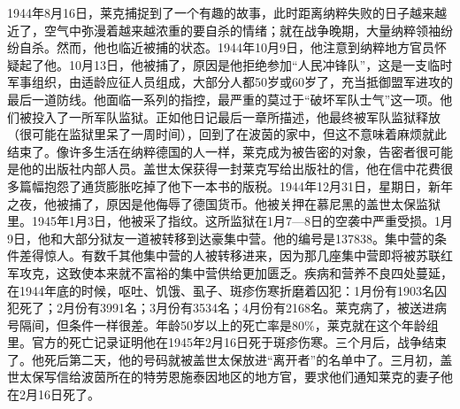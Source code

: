 \documentclass[UTF8]{ctexart}
\begin{document}
1944年8月16日，莱克捕捉到了一个有趣的故事，此时距离纳粹失败的日子越来越近了，空气中弥漫着越来越浓重的要自杀的情绪；就在战争晚期，大量纳粹领袖纷纷自杀。然而，他也临近被捕的状态。1944年10月9日，他注意到纳粹地方官员怀疑起了他。10月13日，他被捕了，原因是他拒绝参加“人民冲锋队”，这是一支临时军事组织，由适龄应征人员组成，大部分人都50岁或60岁了，充当抵御盟军进攻的最后一道防线。他面临一系列的指控，最严重的莫过于“破坏军队士气”这一项。他们被投入了一所军队监狱。正如他日记最后一章所描述，他最终被军队监狱释放（很可能在监狱里呆了一周时间），回到了在波茵的家中，但这不意味着麻烦就此结束了。像许多生活在纳粹德国的人一样，莱克成为被告密的对象，告密者很可能是他的出版社内部人员。盖世太保获得一封莱克写给出版社的信，他在信中花费很多篇幅抱怨了通货膨胀吃掉了他下一本书的版税。1944年12月31日，星期日，新年之夜，他被捕了，原因是他侮辱了德国货币。他被关押在慕尼黑的盖世太保监狱里。1945年1月3日，他被采了指纹。这所监狱在1月7—8日的空袭中严重受损。1月9日，他和大部分狱友一道被转移到达豪集中营。他的编号是137838。集中营的条件差得惊人。有数千其他集中营的人被转移进来，因为那几座集中营即将被苏联红军攻克，这致使本来就不富裕的集中营供给更加匮乏。疾病和营养不良四处蔓延，在1944年底的时候，呕吐、饥饿、虱子、斑疹伤寒折磨着囚犯：1月份有1903名囚犯死了；2月份有3991名；3月份有3534名；4月份有2168名。莱克病了，被送进病号隔间，但条件一样很差。年龄50岁以上的死亡率是80\%，莱克就在这个年龄组里。官方的死亡记录证明他在1945年2月16日死于斑疹伤寒。三个月后，战争结束了。他死后第二天，他的号码就被盖世太保放进“离开者”的名单中了。三月初，盖世太保写信给波茵所在的特劳恩施泰因地区的地方官，要求他们通知莱克的妻子他在2月16日死了。
\end{document}
